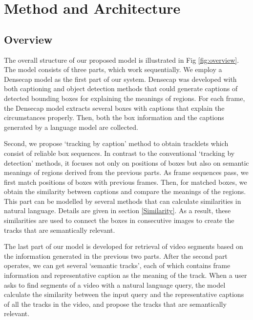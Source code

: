 \section{Method and Architecture}

\subsection{Overview}

The overall structure of our proposed model is illustrated in Fig \textcolor{red}{\ref{fig:overview}}. The model consists of three parts, which work sequentially. We employ a Densecap model \cite{johnson2016densecap} as the first part of our system. 
Densecap was developed with both captioning and object detection methods that could generate captions of detected bounding boxes  for explaining the meanings of regions. 
For each frame, the Densecap model extracts several boxes with captions that explain the circumstances properly. Then, both the box information and the captions generated by a language model are collected.
 
Second, we propose `tracking by caption' method to obtain tracklets which consist of reliable box sequences. In contrast to the conventional `tracking by detection' methods, it focuses not only on positions of boxes but also on semantic meanings of regions derived from the previous parts. As frame sequences pass, we first match positions of boxes with previous frames. Then, for matched boxes, we obtain the similarity between captions and compare the meanings of the regions.
This part can be modelled by several methods that can calculate similarities in natural language. Details are given in section \ref{Similarity}. 
As a result, these similarities are used to connect the boxes in consecutive images to create the tracks that are semantically relevant.

The last part of our model is developed for retrieval of video segments based on the information generated in the previous two parts. After the second part operates, we can get several `semantic tracks', each of which contains frame information and representative caption as the meaning of the track. When a user asks to find segments of a video with a natural language query, the model calculate the similarity between the input query and the representative captions of all the tracks in the video, and propose the tracks that are semantically relevant.


